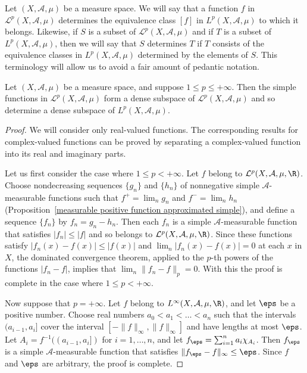 Let $(X,\mathcal{A},\mu)$ be a measure space. We will say that a function $f$ in $\mathcal{L}^p(X,\mathcal{A},\mu)$ determines the equivalence class $[f]$ in $L^p(X,\mathcal{A},\mu)$ to which it belongs. Likewise, if $S$ is a subset of $\mathcal{L}^p(X,\mathcal{A},\mu)$ and if $T$ is a subset of $L^p(X,\mathcal{A},\mu)$, then we will say that $S$ determines $T$ if $T$ consists of the equivalence classes in $L^p(X,\mathcal{A},\mu)$ determined by the elements of $S$. This terminology will allow us to avoid a fair
amount of pedantic notation.
\begin{proposition}\label{L^p space simple function dense}
Let $(X,\mathcal{A},\mu)$ be a measure space, and suppose $1\leq p\leq+\infty$. Then the simple functions in $\mathcal{L}^p(X,\mathcal{A},\mu)$ form a dense subspace of $\mathcal{L}^p(X,\mathcal{A},\mu)$ and so determine a dense subspace of $L^p(X,\mathcal{A},\mu)$.
\end{proposition}
\begin{proof}
We will consider only real-valued functions. The corresponding results for complex-valued functions can be proved by separating a complex-valued function into its real and imaginary parts.\par
Let us first consider the case where $1\leq p<+\infty$. Let $f$ belong to $\mathcal{L}^p(X,\mathcal{A},\mu,\R)$. Choose nondecreasing sequences $\{g_n\}$ and $\{h_n\}$ of nonnegative simple $\mathcal{A}$-measurable functions such that $f^+=\lim_ng_n$ and $f^-=\lim_nh_n$ (Proposition~\ref{measurable positive function approximated simple}), and define a sequence $\{f_n\}$ by $f_n=g_n-h_n$. Then each $f_n$ is a simple $\mathcal{A}$-measurable function that satisfies $|f_n|\leq |f|$ and so belongs to $\mathcal{L}^p(X,\mathcal{A},\mu,\R)$. Since these functions satisfy $|f_n(x)-f(x)|\leq|f(x)|$ and $\lim_n|f_n(x)-f(x)|=0$ at each $x$ in $X$, the dominated convergence theorem, applied to the $p$-th powers of the functions $|f_n-f|$, implies that $\lim_n\|f_n-f\|_p=0$. With this the proof is complete in the case where $1\leq p<+\infty$.\par
Now suppose that $p=+\infty$. Let $f$ belong to $L^\infty(X,\mathcal{A},\mu,\R)$, and let $\eps$ be a positive number. Choose real numbers $a_0<a_1<\dots<a_n$ such that the intervals $(a_{i-1},a_i]$ cover the interval $[-\|f\|_\infty,\|f\|_\infty]$ and have lengths at most $\eps$. Let $A_i=f^{-1}((a_{i-1},a_i])$ for $i=1,\dots,n$, and let $f_\eps=\sum_{i=1}^{n}a_i\chi_{A_i}$. Then $f_\eps$ is a simple $\mathcal{A}$-measurable function that satisfies $\|f_\eps-f\|_\infty\leq\eps$. Since $f$ and $\eps$ are arbitrary, the proof is complete.
\end{proof}
